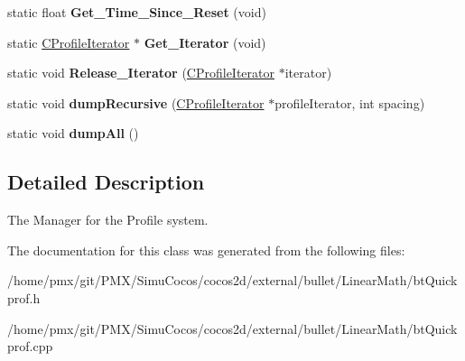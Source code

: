 \begin{DoxyCompactItemize}
\mbox{\label{classCProfileManager_a222152e85f33d1e2104756d3d60338da}} 
static float {\bfseries Get\+\_\+\+Time\+\_\+\+Since\+\_\+\+Reset} (void)
\item 
\mbox{\label{classCProfileManager_adb73d94f650fc4930daa8b4cb5b474a9}} 
static \hyperlink{classCProfileIterator}{C\+Profile\+Iterator} $\ast$ {\bfseries Get\+\_\+\+Iterator} (void)
\item 
\mbox{\label{classCProfileManager_a3edb7249c6f2bdb8a204692c81643d85}} 
static void {\bfseries Release\+\_\+\+Iterator} (\hyperlink{classCProfileIterator}{C\+Profile\+Iterator} $\ast$iterator)
\item 
\mbox{\label{classCProfileManager_a26e52f030104b1a72f9d09f3ca2fda99}} 
static void {\bfseries dump\+Recursive} (\hyperlink{classCProfileIterator}{C\+Profile\+Iterator} $\ast$profile\+Iterator, int spacing)
\item 
\mbox{\label{classCProfileManager_a8c84f517a682f2ebdaf46552fd6f4319}} 
static void {\bfseries dump\+All} ()
\end{DoxyCompactItemize}


\subsection{Detailed Description}
The Manager for the Profile system. 

The documentation for this class was generated from the following files\+:\begin{DoxyCompactItemize}
\item 
/home/pmx/git/\+P\+M\+X/\+Simu\+Cocos/cocos2d/external/bullet/\+Linear\+Math/bt\+Quickprof.\+h\item 
/home/pmx/git/\+P\+M\+X/\+Simu\+Cocos/cocos2d/external/bullet/\+Linear\+Math/bt\+Quickprof.\+cpp\end{DoxyCompactItemize}
